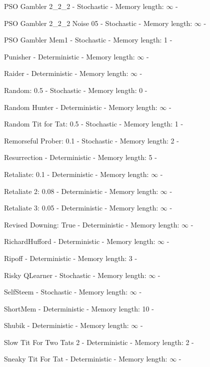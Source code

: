 \item PSO Gambler 2\_2\_2 - Stochastic - Memory length: \(\infty\) - \cite{Knight2018}
\item PSO Gambler 2\_2\_2 Noise 05 - Stochastic - Memory length: \(\infty\) - \cite{Knight2018}
\item PSO Gambler Mem1 - Stochastic - Memory length: 1 - \cite{Knight2018}
\item Punisher - Deterministic - Memory length: \(\infty\) - \cite{Knight2018}
\item Raider - Deterministic - Memory length: \(\infty\) - \cite{Ashlock2014}
\item Random: 0.5 - Stochastic - Memory length: 0 - \cite{Tzafestas2000, Axelrod1980}
\item Random Hunter - Deterministic - Memory length: \(\infty\) - \cite{Knight2018}
\item Random Tit for Tat: 0.5 - Stochastic - Memory length: 1 - \cite{Knight2018}
\item Remorseful Prober: 0.1 - Stochastic - Memory length: 2 - \cite{Li2011}
\item Resurrection - Deterministic - Memory length: 5 - \cite{Eckhart2015}
\item Retaliate: 0.1 - Deterministic - Memory length: \(\infty\) - \cite{Knight2018}
\item Retaliate 2: 0.08 - Deterministic - Memory length: \(\infty\) - \cite{Knight2018}
\item Retaliate 3: 0.05 - Deterministic - Memory length: \(\infty\) - \cite{Knight2018}
\item Revised Downing: True - Deterministic - Memory length: \(\infty\) - \cite{Axelrod1980}
\item RichardHufford - Deterministic - Memory length: \(\infty\) - \cite{Axelrod1980b}
\item Ripoff - Deterministic - Memory length: 3 - \cite{Ashlock2008}
\item Risky QLearner - Stochastic - Memory length: \(\infty\) - \cite{Knight2018}
\item SelfSteem - Stochastic - Memory length: \(\infty\) - \cite{Andre2013}
\item ShortMem - Deterministic - Memory length: 10 - \cite{Andre2013}
\item Shubik - Deterministic - Memory length: \(\infty\) - \cite{Axelrod1980}
\item Slow Tit For Two Tats 2 - Deterministic - Memory length: 2 - \cite{Prison1998}
\item Sneaky Tit For Tat - Deterministic - Memory length: \(\infty\) - \cite{Knight2018}
